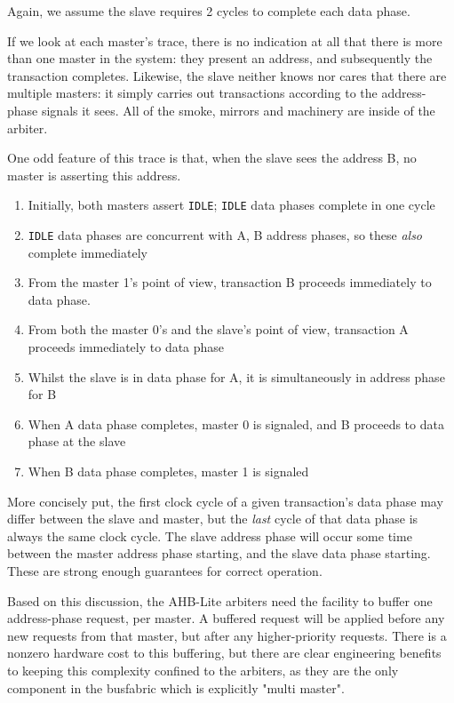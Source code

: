 Again, we assume the slave requires 2 cycles to complete each data phase.

If we look at each master's trace, there is no indication at all that there is more than one master in the system: they present an address, and subsequently the transaction completes. Likewise, the slave neither knows nor cares that there are multiple masters: it simply carries out transactions according to the address-phase signals it sees. All of the smoke, mirrors and machinery are inside of the arbiter.

One odd feature of this trace is that, when the slave sees the address B, no master is asserting this address.

\begin{enumerate}
	\item Initially, both masters assert {\tt IDLE}; {\tt IDLE} data phases complete in one cycle
	\item {\tt IDLE} data phases are concurrent with A, B address phases, so these {\it also} complete immediately
	\item From the master 1's point of view, transaction B proceeds immediately to data phase.
	\item From both the master 0's and the slave's point of view, transaction A proceeds immediately to data phase
	\item Whilst the slave is in data phase for A, it is simultaneously in address phase for B
	\item When A data phase completes, master 0 is signaled, and B proceeds to data phase at the slave
	\item When B data phase completes, master 1 is signaled
\end{enumerate}

More concisely put, the first clock cycle of a given transaction's data phase may differ between the slave and master, but the {\it last} cycle of that data phase is always the same clock cycle. The slave address phase will occur some time between the master address phase starting, and the slave data phase starting. These are strong enough guarantees for correct operation.

Based on this discussion, the AHB-Lite arbiters need the facility to buffer one address-phase request, per master. A buffered request will be applied before any new requests from that master, but after any higher-priority requests. There is a nonzero hardware cost to this buffering, but there are clear engineering benefits to keeping this complexity confined to the arbiters, as they are the only component in the busfabric which is explicitly "multi master".

